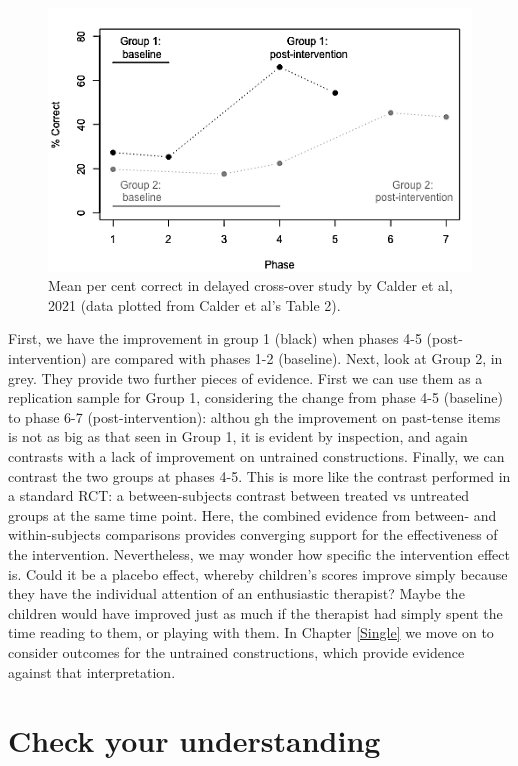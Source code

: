 \documentclass{krantz}
\begin{document}
\begin{figure}
\includegraphics[width=0.75\linewidth]{images_bw/calderfig-1} \caption{Mean per cent correct in delayed cross-over study by Calder et al, 2021 (data plotted from Calder et al's Table 2).}\label{fig:calderfig}
\end{figure}

First, we have the improvement in group 1 (black) when phases 4-5 (post-intervention) are compared with phases 1-2 (baseline). Next, look at Group 2, in grey. They provide two further pieces of evidence. First we can use them as a replication sample for Group 1, considering the change from phase 4-5 (baseline) to phase 6-7 (post-intervention): althou
gh the improvement on past-tense items is not as big as that seen in Group 1, it is evident by inspection, and again contrasts with a lack of improvement on untrained constructions. Finally, we can contrast the two groups at phases 4-5. This is more like the contrast performed in a standard RCT: a between-subjects contrast between treated vs untreated groups at the same time point. Here, the combined evidence from between- and within-subjects comparisons provides converging support for the effectiveness of the intervention. Nevertheless, we may wonder how specific the intervention effect is. Could it be a placebo effect, whereby children's scores improve simply because they have the individual attention of an enthusiastic therapist? Maybe the children would have improved just as much if the therapist had simply spent the time reading to them, or playing with them. In Chapter \ref{Single} we move on to consider outcomes for the untrained constructions, which provide evidence against that interpretation.

\hypertarget{check-your-understanding-18}{%
\section{Check your understanding}\label{check-your-understanding-18}}
\end{document}
